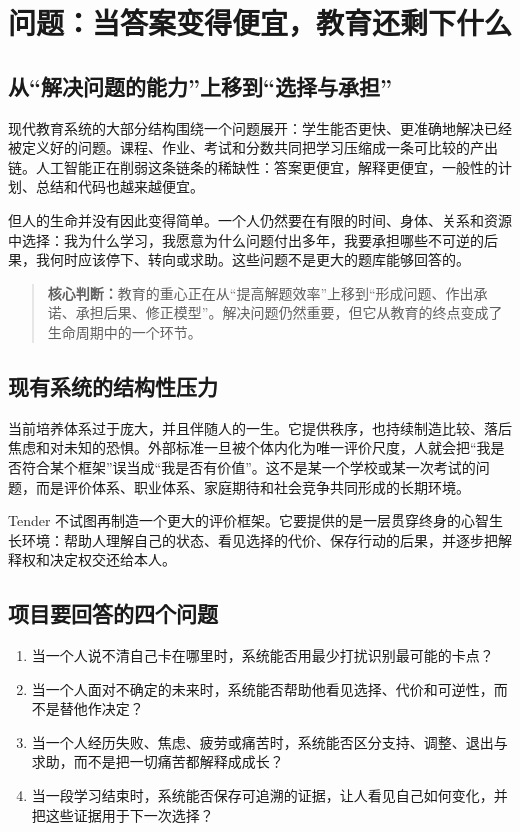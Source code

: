 \documentclass[UTF8,a4paper,11pt]{ctexart}
\newcommand{\keypoint}[1]{\begin{quote}\noindent\textbf{\color{TenderBlue}核心判断：}#1\end{quote}}
\begin{document}
\newpage
\section{问题：当答案变得便宜，教育还剩下什么}

\subsection{从“解决问题的能力”上移到“选择与承担”}

现代教育系统的大部分结构围绕一个问题展开：学生能否更快、更准确地解决已经被定义好的问题。课程、作业、考试和分数共同把学习压缩成一条可比较的产出链。人工智能正在削弱这条链条的稀缺性：答案更便宜，解释更便宜，一般性的计划、总结和代码也越来越便宜。

但人的生命并没有因此变得简单。一个人仍然要在有限的时间、身体、关系和资源中选择：我为什么学习，我愿意为什么问题付出多年，我要承担哪些不可逆的后果，我何时应该停下、转向或求助。这些问题不是更大的题库能够回答的。

\keypoint{教育的重心正在从“提高解题效率”上移到“形成问题、作出承诺、承担后果、修正模型”。解决问题仍然重要，但它从教育的终点变成了生命周期中的一个环节。}

\subsection{现有系统的结构性压力}

当前培养体系过于庞大，并且伴随人的一生。它提供秩序，也持续制造比较、落后焦虑和对未知的恐惧。外部标准一旦被个体内化为唯一评价尺度，人就会把“我是否符合某个框架”误当成“我是否有价值”。这不是某一个学校或某一次考试的问题，而是评价体系、职业体系、家庭期待和社会竞争共同形成的长期环境。

Tender 不试图再制造一个更大的评价框架。它要提供的是一层贯穿终身的心智生长环境：帮助人理解自己的状态、看见选择的代价、保存行动的后果，并逐步把解释权和决定权交还给本人。

\subsection{项目要回答的四个问题}

\begin{enumerate}
\item 当一个人说不清自己卡在哪里时，系统能否用最少打扰识别最可能的卡点？
\item 当一个人面对不确定的未来时，系统能否帮助他看见选择、代价和可逆性，而不是替他作决定？
\item 当一个人经历失败、焦虑、疲劳或痛苦时，系统能否区分支持、调整、退出与求助，而不是把一切痛苦都解释成成长？
\item 当一段学习结束时，系统能否保存可追溯的证据，让人看见自己如何变化，并把这些证据用于下一次选择？
\end{enumerate}
\end{document}
